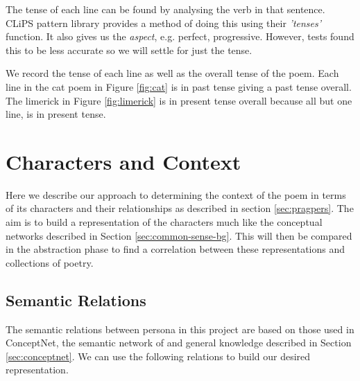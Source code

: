 The tense of each line can be found by analysing the verb in that sentence. CLiPS pattern library provides a method of doing this using their \textit{'tenses'} function. It also gives us the \textit{aspect}, e.g. perfect, progressive. However, tests found this to be less accurate so we will settle for just the tense.

We record the tense of each line as well as the overall tense of the poem. Each line in the cat poem in Figure \ref{fig:cat} is in past tense giving a past tense overall. The limerick in Figure \ref{fig:limerick} is in present tense overall because all but one line, is in present tense. 


\section{Characters and Context}
\label{sec:chars}
Here we describe our approach to determining the context of the poem in terms of its characters and their relationships as described in section \ref{sec:pragpers}. The aim is to build a representation of the characters much like the conceptual networks described in Section \ref{sec:common-sense-bg}. This will then be compared in the abstraction phase to find a correlation between these representations and collections of poetry.

\subsection{Semantic Relations}
The semantic relations between persona in this project are based on those used in ConceptNet, the semantic network of and general knowledge described in Section \ref{sec:conceptnet}. We can use the following relations to build our desired representation.

